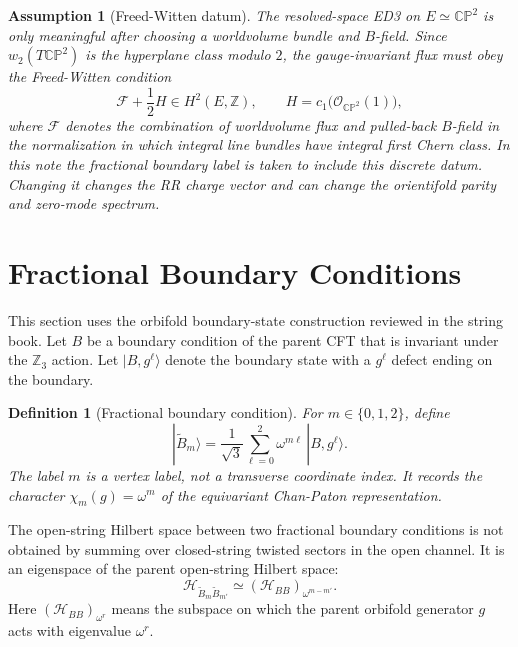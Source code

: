 \documentclass[11pt]{article}
\newcommand{\Z}{\mathbb{Z}}
\newcommand{\CP}{\mathbb{CP}}
\newcommand{\cO}{\mathcal{O}}
\newcommand{\cF}{\mathcal{F}}
\newcommand{\cH}{\mathcal{H}}
\newcommand{\wt}{\widetilde}
\newtheorem{assumption}{Assumption}
\newtheorem{definition}{Definition}
\begin{document}
\begin{assumption}[Freed-Witten datum]
The resolved-space ED3 on $E\simeq\CP^2$ is only meaningful after choosing a worldvolume
bundle and $B$-field. Since $w_2(T\CP^2)$ is the hyperplane class modulo $2$, the gauge-invariant
flux must obey the Freed-Witten condition
\begin{equation}
  \cF+\frac{1}{2}H\in H^2(E,\Z),
  \qquad
  H=c_1\bigl(\cO_{\CP^2}(1)\bigr),
  \label{eq:freed-witten}
\end{equation}
where $\cF$ denotes the combination of worldvolume flux and pulled-back $B$-field in the
normalization in which integral line bundles have integral first Chern class. In this note the
fractional boundary label is taken to include this discrete datum. Changing it changes the RR
charge vector and can change the orientifold parity and zero-mode spectrum.
\end{assumption}

\section{Fractional Boundary Conditions}

This section uses the orbifold boundary-state construction reviewed in the string book. Let
$B$ be a boundary condition of the parent CFT that is invariant under the $\Z_3$ action. Let
$|B,g^\ell\rangle$ denote the boundary state with a $g^\ell$ defect ending on the boundary.

\begin{definition}[Fractional boundary condition]
For $m\in\{0,1,2\}$, define
\begin{equation}
  |\wt B_m\rangle
  =
  \frac{1}{\sqrt{3}}
  \sum_{\ell=0}^{2}\omega^{m\ell}\,|B,g^\ell\rangle.
  \label{eq:fractional-boundary-state}
\end{equation}
The label $m$ is a vertex label, not a transverse coordinate index. It records the character
$\chi_m(g)=\omega^m$ of the equivariant Chan-Paton representation.
\end{definition}

The open-string Hilbert space between two fractional boundary conditions is not obtained by
summing over closed-string twisted sectors in the open channel. It is an eigenspace of the
parent open-string Hilbert space:
\begin{equation}
  \cH_{\wt B_m\wt B_{m'}}
  \simeq
  \left(\cH_{BB}\right)_{\omega^{m-m'}}.
  \label{eq:fractional-open-eigenspace}
\end{equation}
Here $\left(\cH_{BB}\right)_{\omega^r}$ means the subspace on which the parent orbifold
generator $g$ acts with eigenvalue $\omega^r$.
\end{document}
